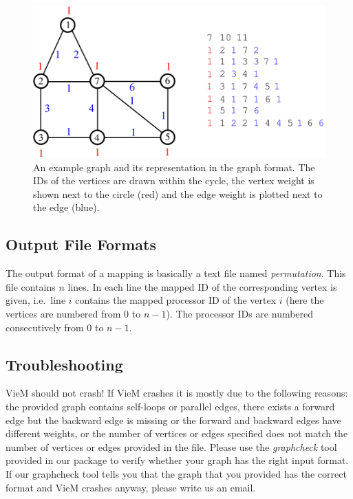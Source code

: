 \documentclass[11pt]{article}
\newcommand{\ie}{i.e.\ }
\begin{document}
\begin{figure}[h!]
\begin{center}
\includegraphics[width=.8\textwidth]{example_graph.pdf}
\end{center}

\caption{An example graph and its representation in the graph format. The IDs of the vertices are drawn within the cycle, the vertex weight is shown next to the circle ({\color{red}red}) and the edge weight is plotted next to the edge ({\color{blue}blue}).}
\label{fig:example}
\end{figure}

\subsection{Output File Formats}
The output format of a mapping is basically a text file named \emph{permutation}. 
This file contains $n$ lines. 
In each line the mapped ID of the corresponding vertex is given, \ie line $i$ contains the mapped processor ID of the vertex $i$ (here the vertices are numbered from 0 to $n-1$).
The processor IDs are numbered consecutively from 0 to $n-1$. 
\subsection{Troubleshooting}
VieM should not crash! If VieM crashes it is mostly due to the following reasons: the provided graph contains self-loops or parallel edges, there exists a forward edge but the backward edge is missing or the forward and backward edges have different weights, or the number of vertices or edges specified does not match the number of vertices or edges provided in the file.
Please use the \emph{graphcheck} tool provided in our package to verify whether your graph has the right input format. If our graphcheck tool tells you that the graph that you provided has the correct format and VieM crashes anyway, please write us an email.
\end{document}
